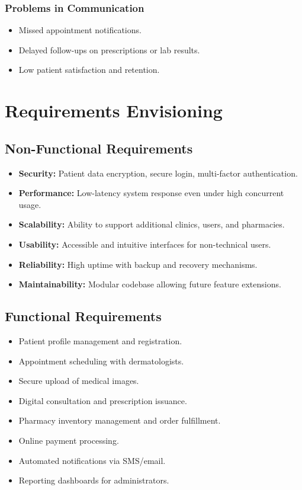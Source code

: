 \documentclass[12pt,a4paper]{report}
\begin{document}
\subsubsection{Problems in Communication}
\begin{itemize}
    \item Missed appointment notifications.
    \item Delayed follow-ups on prescriptions or lab results.
    \item Low patient satisfaction and retention.
\end{itemize}

\section{Requirements Envisioning}
\subsection{Non-Functional Requirements}
\begin{itemize}
    \item \textbf{Security:} Patient data encryption, secure login, multi-factor authentication.
    \item \textbf{Performance:} Low-latency system response even under high concurrent usage.
    \item \textbf{Scalability:} Ability to support additional clinics, users, and pharmacies.
    \item \textbf{Usability:} Accessible and intuitive interfaces for non-technical users.
    \item \textbf{Reliability:} High uptime with backup and recovery mechanisms.
    \item \textbf{Maintainability:} Modular codebase allowing future feature extensions.
\end{itemize}

\subsection{Functional Requirements}
\begin{itemize}
    \item Patient profile management and registration.
    \item Appointment scheduling with dermatologists.
    \item Secure upload of medical images.
    \item Digital consultation and prescription issuance.
    \item Pharmacy inventory management and order fulfillment.
    \item Online payment processing.
    \item Automated notifications via SMS/email.
    \item Reporting dashboards for administrators.
\end{itemize}
\end{document}

